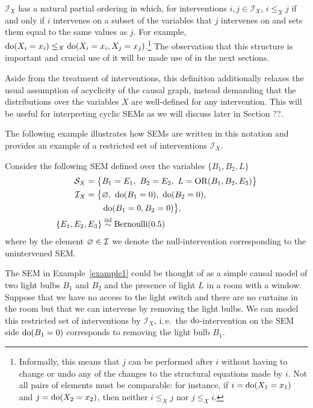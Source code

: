 $\mathcal{I}_X$ has a natural partial ordering in which, for interventions ${i, j \in \mathcal{I}_X}$, ${i\leq_X j}$ if and only if $i$ intervenes on a subset of the variables that $j$ intervenes on and sets them equal to the same values as $j$.
For example, ${\operatorname{do}(X_i=x_i) \leq_X \operatorname{do}(X_i=x_i, X_j=x_j)}$.\footnote{Informally, this means that $j$ can be performed after $i$ without having to change or undo any of the changes to the structural equations made by $i$.
Not all pairs of elements must be comparable: for instance, if $i= \operatorname{do}(X_1=x_1)$ and $j = \operatorname{do}(X_2=x_2)$, then neither $i\leq_X j$ nor $j \leq_X i$.} The observation that this structure is important and crucial use of it will be made use of in the next sections.

Aside from the treatment of interventions, this definition additionally relaxes the usual assumption of acyclicity of the causal graph, instead demanding that the distributions over the variables $X$ are well-defined for any intervention.
This will be useful for interpreting cyclic SEMs as we will discuss later in Section ??.

The following example illustrates how SEMs are written in this notation and provides an example of a restricted set of interventions $\mathcal{I}_X$.

\begin{example}\label{example1}
Consider the following SEM defined over the variables $\{ B_1,B_2,L \}$
%
\begin{align*}
\mathcal{S}_X = \big\{ & B_1 = E_1,\ B_2 = E_2,\ L = \operatorname{OR}(B_1,B_2,E_3) \big\} \\
%
\mathcal{I}_X = \big\{ & \nulli,\ \doop(B_1=0),\ \doop(B_2=0),\\
& \doop(B_1=0,B_2=0) \big\}, \\
%
\{ E_1,E_2,E_3 \} & \overset{\text{iid}}{\sim} \mathrm{Bernoulli}(0.5)
\end{align*}
%
where by the element $\varnothing \in \mathcal{I}$ we denote the null-intervention corresponding to the unintervened SEM\@.
\end{example}

The SEM in Example~\ref{example1} could be thought of as a simple causal model of two light bulbs $B_1$ and $B_2$ and the presence of light $L$ in a room with a window.
Suppose that we have no access to the light switch and there are no curtains in the room but that we can intervene by removing the light bulbs.
We can model this restricted set of interventions by $\mathcal{I}_X$, i.\,e.\ the $\operatorname{do}$-intervention on the SEM side ${\operatorname{do}(B_1=0)}$  corresponds to removing the light bulb $B_1$.

